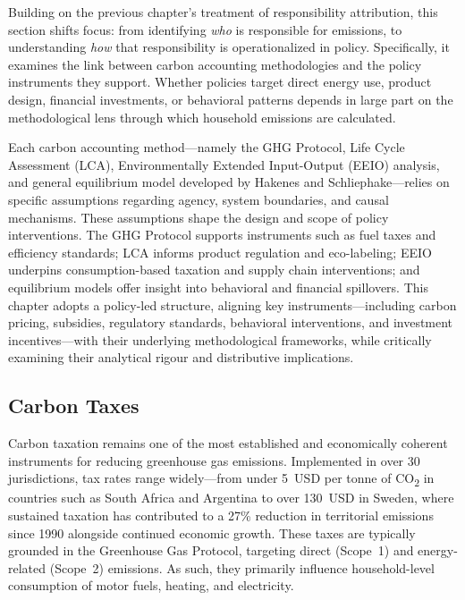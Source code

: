 \documentclass[12pt,a4paper]{article}%
\begin{document}
Building on the previous chapter’s treatment of responsibility attribution, this section shifts focus: from identifying \textit{who} is responsible for emissions, to understanding \textit{how} that responsibility is operationalized in policy. Specifically, it examines the link between carbon accounting methodologies and the policy instruments they support. Whether policies target direct energy use, product design, financial investments, or behavioral patterns depends in large part on the methodological lens through which household emissions are calculated.

Each carbon accounting method—namely the GHG Protocol, Life Cycle Assessment (LCA), Environmentally Extended Input-Output (EEIO) analysis, and general equilibrium model developed by Hakenes and Schliephake—relies on specific assumptions regarding agency, system boundaries, and causal mechanisms. These assumptions shape the design and scope of policy interventions. The GHG Protocol supports instruments such as fuel taxes and efficiency standards; LCA informs product regulation and eco-labeling; EEIO underpins consumption-based taxation and supply chain interventions; and equilibrium models offer insight into behavioral and financial spillovers. This chapter adopts a policy-led structure, aligning key instruments—including carbon pricing, subsidies, regulatory standards, behavioral interventions, and investment incentives—with their underlying methodological frameworks, while critically examining their analytical rigour and distributive implications.

\subsection{Carbon Taxes}

Carbon taxation remains one of the most established and economically coherent instruments for reducing greenhouse gas emissions. Implemented in over 30 jurisdictions, tax rates range widely---from under 5~USD per tonne of CO\textsubscript{2} in countries such as South Africa and Argentina to over 130~USD in Sweden, where sustained taxation has contributed to a 27\% reduction in territorial emissions since 1990 alongside continued economic growth. These taxes are typically grounded in the Greenhouse Gas Protocol, targeting direct (Scope~1) and energy-related (Scope~2) emissions. As such, they primarily influence household-level consumption of motor fuels, heating, and electricity.
\end{document}
